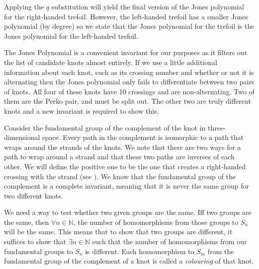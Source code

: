 \begin{paper}
Applying the $q$ substitution will yield the final version of the Jones
polynomial for the right-handed trefoil.
However, the left-handed trefoil has a smaller Jones polynomial (by degree) so
we state that the Jones polynomial for the trefoil is the Jones polynomial for
the left-handed trefoil.




The Jones Polynomial is a convenient invariant for our purposes as it filters
out the list of candidate knots almost entirely.
If we use a little additional information about each knot, such as its crossing
number and whether or not it is alternating then the Jones polynomial only fails
to differentiate between two pairs of knots.
All four of these knots have 10 crossings and are non-alternating.
Two of them are the Perko pair, and must be split out.
The other two are truly different knots and a new invariant is required to show
this.

Consider the fundamental group of the complement of the knot in
three-dimensional space.
Every path in the complement is isomorphic to a path that wraps around the
strands of the knots.
We note that there are two ways for a path to wrap around a strand and that
these two paths are inverses of each other.
We will define the positive one to be the one that creates a right-handed
crossing with the strand (see \figCrossings).
We know that the fundamental group of the complement is a complete invariant,
meaning that it is never the same group for two different knots.

We need a way to test whether two given groups are the same.
Iff two groups are the same, then $\forall n\in\mathbb N$, the number of
homomorphisms from those groups to $S_n$ will be the same.
This means that to show that two groups are different, it suffices to show that
$\exists n\in\mathbb N$ such that the number of homomorphisms from our
fundamental groups to $S_n$ is different.
Each homomorphism to $S_m$ from the fundamental group of the complement of a
knot is called a \textit{colouring} of that knot.

\end{paper}
